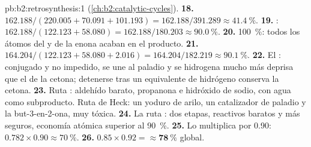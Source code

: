 \begin{solution}{pb:b2:retrosynthesis:1}
(\cref{ch:b2:catalytic-cycles}).
\textbf{18.} $162.188/(220.005 + 70.091 + 101.193) = 162.188/391.289 \approx 41.4~\%$.
\textbf{19.} : $162.188/(122.123 + 58.080) = 162.188/180.203
\approx 90.0~\%$.
\textbf{20.} 100~\%: todos los átomos del  y de la enona acaban en el producto.
\textbf{21.} $164.204/(122.123 + 58.080 + 2.016) = 164.204/182.219 \approx 90.1~\%$.
\textbf{22.} El : conjugado y no impedido, se une al paladio y se hidrogena mucho más deprisa
que el  de la cetona; detenerse tras un equivalente de hidrógeno conserva la cetona.
\textbf{23.} Ruta : aldehído barato, propanona e hidróxido de sodio, con agua como subproducto. Ruta de
Heck: un yoduro de arilo, un catalizador de paladio y la but-3-en-2-ona, muy tóxica.
\textbf{24.} La ruta : dos etapas, reactivos baratos y más seguros, economía atómica superior al 90~\%.
\textbf{25.} Lo multiplica por 0.90: $0.782 \times 0.90 \approx 70~\%$.
\textbf{26.} $0.85 \times 0.92 = \boldsymbol{\approx 78~\%}$ global.
\end{solution}
